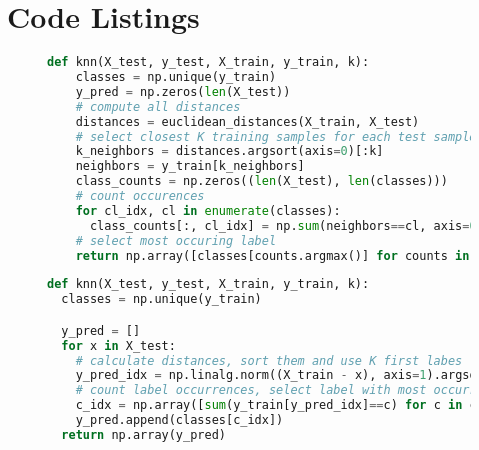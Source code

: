 \chapter{Code Listings}
\label{ch:code-listings}
\begin{figure}[!h]
  
  \begin{lstlisting}[language=Python, caption={K-Nearest Neighbor Classifier (KNN) inference implementation optimized for $N>>D$}, label={alg:knn_inference_optimized_0}]
  def knn(X_test, y_test, X_train, y_train, k):
    classes = np.unique(y_train)
    y_pred = np.zeros(len(X_test))
    # compute all distances
    distances = euclidean_distances(X_train, X_test)
    # select closest K training samples for each test sample
    k_neighbors = distances.argsort(axis=0)[:k]
    neighbors = y_train[k_neighbors]
    class_counts = np.zeros((len(X_test), len(classes)))
    # count occurences
    for cl_idx, cl in enumerate(classes):
      class_counts[:, cl_idx] = np.sum(neighbors==cl, axis=0)
    # select most occuring label
    return np.array([classes[counts.argmax()] for counts in class_counts])
  \end{lstlisting}
\end{figure}
\begin{figure}[!h]
  
  \begin{lstlisting}[language=Python, caption={K-Nearest Neighbor Classifier (KNN) inference implementation optimized for $N\approx D$}, label={alg:knn_inference_optimized_1}]
def knn(X_test, y_test, X_train, y_train, k):
  classes = np.unique(y_train)

  y_pred = []
  for x in X_test:
    # calculate distances, sort them and use K first labes
    y_pred_idx = np.linalg.norm((X_train - x), axis=1).argsort()[:k]
    # count label occurrences, select label with most occurrence
    c_idx = np.array([sum(y_train[y_pred_idx]==c) for c in classes]).argmax()
    y_pred.append(classes[c_idx])
  return np.array(y_pred)
  \end{lstlisting}
\end{figure}


